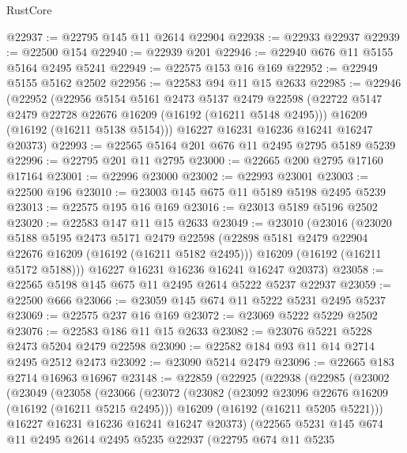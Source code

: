 \begin{lexlean}{RustCore}
\begin{coremodule}
@22937 := @22795 @145 @11 @2614 @22904
@22938 := @22933 @22937
@22939 := @22500 @154
@22940 := @22939 @201
@22946 := @22940 @676 @11 @5155 @5164 @2495 @5241
@22949 := @22575 @153 @16 @169
@22952 := @22949 @5155 @5162 @2502
@22956 := @22583 @94 @11 @15 @2633
@22985 := @22946
    (@22952
      (@22956
        @5154
        @5161
        @2473
        @5137
        @2479
        @22598
        (@22722 @5147 @2479 @22728 @22676 @16209 (@16192 (@16211 @5148 @2495)))
        @16209
        (@16192 (@16211 @5138 @5154)))
      @16227
      @16231
      @16236
      @16241
      @16247
      @20373)
@22993 := @22565 @5164 @201 @676 @11 @2495 @2795 @5189 @5239
@22996 := @22795 @201 @11 @2795
@23000 := @22665 @200 @2795 @17160 @17164
@23001 := @22996 @23000
@23002 := @22993 @23001
@23003 := @22500 @196
@23010 := @23003 @145 @675 @11 @5189 @5198 @2495 @5239
@23013 := @22575 @195 @16 @169
@23016 := @23013 @5189 @5196 @2502
@23020 := @22583 @147 @11 @15 @2633
@23049 := @23010
    (@23016
      (@23020
        @5188
        @5195
        @2473
        @5171
        @2479
        @22598
        (@22898 @5181 @2479 @22904 @22676 @16209 (@16192 (@16211 @5182 @2495)))
        @16209
        (@16192 (@16211 @5172 @5188)))
      @16227
      @16231
      @16236
      @16241
      @16247
      @20373)
@23058 := @22565 @5198 @145 @675 @11 @2495 @2614 @5222 @5237 @22937
@23059 := @22500 @666
@23066 := @23059 @145 @674 @11 @5222 @5231 @2495 @5237
@23069 := @22575 @237 @16 @169
@23072 := @23069 @5222 @5229 @2502
@23076 := @22583 @186 @11 @15 @2633
@23082 := @23076 @5221 @5228 @2473 @5204 @2479 @22598
@23090 := @22582 @184 @93 @11 @14 @2714 @2495 @2512 @2473
@23092 := @23090 @5214 @2479
@23096 := @22665 @183 @2714 @16963 @16967
@23148 := @22859
    (@22925
      (@22938
        (@22985
          (@23002
            (@23049
              (@23058
                (@23066
                  (@23072
                    (@23082
                      (@23092 @23096 @22676 @16209 (@16192 (@16211 @5215 @2495)))
                      @16209
                      (@16192 (@16211 @5205 @5221)))
                    @16227
                    @16231
                    @16236
                    @16241
                    @16247
                    @20373)
                  (@22565
                    @5231
                    @145
                    @674
                    @11
                    @2495
                    @2614
                    @2495
                    @5235
                    @22937
                    (@22795
                      @674
                      @11
                      @5235

\end{coremodule}
\end{lexlean}
